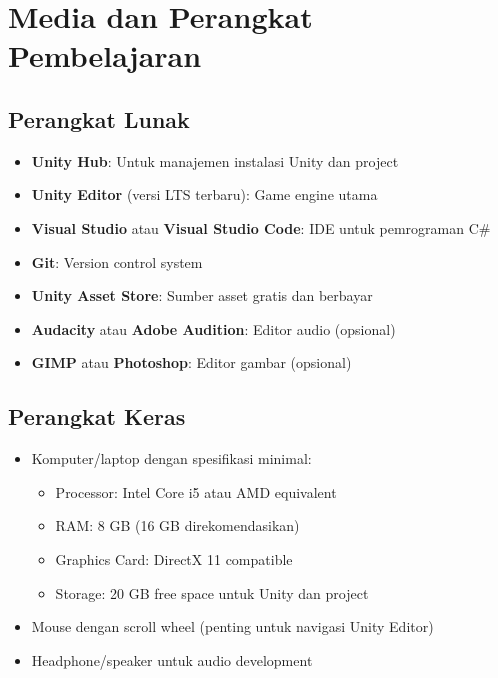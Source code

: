 \documentclass[a4paper,12pt]{article}
\begin{document}
\section{Media dan Perangkat Pembelajaran}

\subsection{Perangkat Lunak}
\begin{itemize}
\item \textbf{Unity Hub}: Untuk manajemen instalasi Unity dan project
\item \textbf{Unity Editor} (versi LTS terbaru): Game engine utama
\item \textbf{Visual Studio} atau \textbf{Visual Studio Code}: IDE untuk pemrograman C\#
\item \textbf{Git}: Version control system
\item \textbf{Unity Asset Store}: Sumber asset gratis dan berbayar
\item \textbf{Audacity} atau \textbf{Adobe Audition}: Editor audio (opsional)
\item \textbf{GIMP} atau \textbf{Photoshop}: Editor gambar (opsional)
\end{itemize}

\subsection{Perangkat Keras}
\begin{itemize}
\item Komputer/laptop dengan spesifikasi minimal:
\begin{itemize}
\item Processor: Intel Core i5 atau AMD equivalent
\item RAM: 8 GB (16 GB direkomendasikan)
\item Graphics Card: DirectX 11 compatible
\item Storage: 20 GB free space untuk Unity dan project
\end{itemize}
\item Mouse dengan scroll wheel (penting untuk navigasi Unity Editor)
\item Headphone/speaker untuk audio development
\end{itemize}
\end{document}
